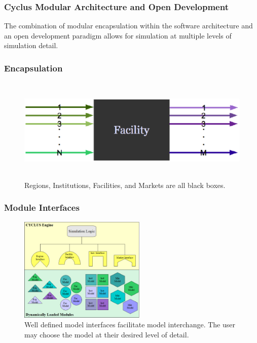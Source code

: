 \begin{frame}
  \frametitle{Cyclus Modular Architecture and Open Development}
  The combination of modular encapsulation within the software
  architecture and an open development paradigm allows for simulation
  at multiple levels of simulation detail.
\end{frame}
\begin{frame}[ctb!]
  \frametitle{Encapsulation}
  \begin{figure}[htbp!]
    \begin{center}
      \includegraphics[height=5cm]{facility.eps}
    \end{center}
    \caption{ Regions, Institutions, Facilities, and Markets are all
    black boxes.} 
    \label{fig:sinkfacility}
  \end{figure}
\end{frame}

\begin{frame}[ctb!]
  \frametitle{Module Interfaces}
  \begin{figure}[htbp!]
    \begin{center}
      \includegraphics[height=5cm]{interfaces.eps}
    \caption{Well defined model interfaces facilitate model 
    interchange. The user may choose the model at their desired level  
    of detail.}
    \label{fig:interfaces}
    \end{center}
  \end{figure}
\end{frame}

